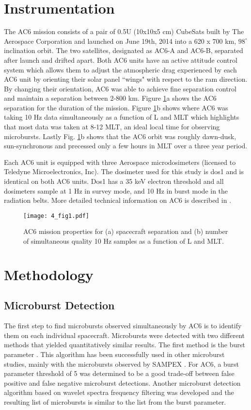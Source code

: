 \section{Instrumentation} \label{instrumentation}
The AC6 mission consists of a pair of 0.5U (10x10x5 cm) CubeSats built by The Aerospace Corporation and launched on June 19th, 2014 into a 620 x 700 km, $98^\circ$ inclination orbit. The two satellites, designated as AC6-A and AC6-B, separated after launch and drifted apart. Both AC6 units have an active attitude control system which allows them to adjust the atmospheric drag experienced by each AC6 unit by orienting their solar panel ``wings" with respect to the ram direction. By changing their orientation, AC6 was able to achieve fine separation control and maintain a separation between 2-800 km. Figure \ref{fig1}a shows the AC6 separation for the duration of the mission. Figure \ref{fig1}b shows where AC6 was taking 10 Hz data simultaneously as a function of L and MLT which highlights that most data was taken at 8-12 MLT, an ideal local time for observing microbursts. Lastly Fig. \ref{fig1}b shows that the AC6 orbit was roughly dawn-dusk, sun-synchronous and precessed only a few hours in MLT over a three year period.

Each AC6 unit is equipped with three Aerospace microdosimeters (licensed to Teledyne Microelectronics, Inc). The dosimeter used for this study is dos1 and is identical on both AC6 units. Dos1 has a 35 keV electron threshold and all dosimeters sample at 1 Hz in survey mode, and 10 Hz in burst mode in the radiation belts. More detailed technical information on AC6 is described in \citet{O'brien2016}. 

\begin{figure}
\texttt{[image: 4\_fig1.pdf]}
\caption{AC6 mission properties for (a) spacecraft separation and (b) number of simultaneous quality 10 Hz samples as a function of L and MLT.} \label{fig1}
\end{figure}

\section{Methodology} 
\subsection{Microburst Detection} \label{microburst_detection}
The first step to find microbursts observed simultaneously by AC6 is to identify them on each individual spacecraft. Microbursts were detected with two different methods that yielded quantitatively similar results. The first method is the burst parameter \citep{O'Brien2003}. This algorithm has been successfully used in other microburst studies, mainly with the microbursts observed by SAMPEX \citep[e.g.][]{O'Brien2003, Blum2015, Douma2017}. For AC6, a burst parameter threshold of 5 was determined to be a good trade-off between false positive and false negative microburst detections. Another microburst detection algorithm based on wavelet spectra frequency filtering was developed and the resulting list of microbursts is similar to the list from the burst parameter.

